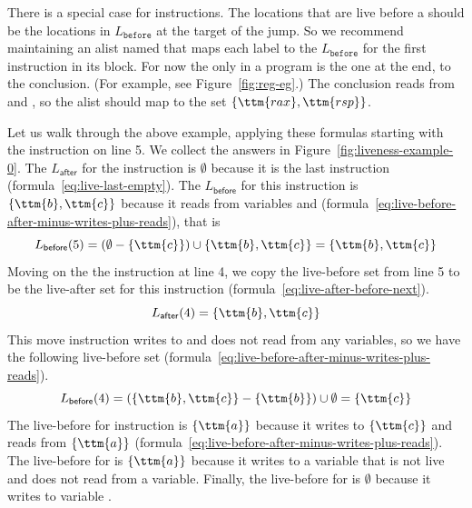 \documentclass[11pt]{book}
\begin{document}
There is a special case for  instructions.  The locations
that are live before a  should be the locations in
$L_{\mathtt{before}}$ at the target of the jump. So we recommend
maintaining an alist named  that maps each label to
the $L_{\mathtt{before}}$ for the first instruction in its block. For
now the only  in a \LangXVar{} program is the one at the
end, to the conclusion. (For example, see Figure~\ref{fig:reg-eg}.)
The conclusion reads from  and , so the alist should
map  to the set $\{\ttm{rax},\ttm{rsp}\}$.

Let us walk through the above example, applying these formulas
starting with the instruction on line 5. We collect the answers in
Figure~\ref{fig:liveness-example-0}.  The $L_{\mathsf{after}}$ for the
 instruction is $\emptyset$ because it is the last
instruction (formula~\ref{eq:live-last-empty}).  The
$L_{\mathsf{before}}$ for this instruction is $\{\ttm{b},\ttm{c}\}$
because it reads from variables  and 
(formula~\ref{eq:live-before-after-minus-writes-plus-reads}), that is
\[
   L_{\mathsf{before}}(5) = (\emptyset - \{\ttm{c}\}) \cup \{ \ttm{b}, \ttm{c} \} = \{ \ttm{b}, \ttm{c} \}
\]
Moving on the the instruction  at line 4, we copy
the live-before set from line 5 to be the live-after set for this
instruction (formula~\ref{eq:live-after-before-next}).
\[
  L_{\mathsf{after}}(4) = \{ \ttm{b}, \ttm{c} \}
\]
This move instruction writes to  and does not read from any
variables, so we have the following live-before set
(formula~\ref{eq:live-before-after-minus-writes-plus-reads}).
\[
  L_{\mathsf{before}}(4) = (\{\ttm{b},\ttm{c}\} - \{\ttm{b}\}) \cup \emptyset = \{ \ttm{c} \}
\]
The live-before for instruction 
is $\{\ttm{a}\}$ because it writes to $\{\ttm{c}\}$ and reads from $\{\ttm{a}\}$
(formula~\ref{eq:live-before-after-minus-writes-plus-reads}).  The
live-before for  is $\{\ttm{a}\}$ because it writes to a
variable that is not live and does not read from a variable.
Finally, the live-before for  is $\emptyset$
because it writes to variable .
\end{document}
